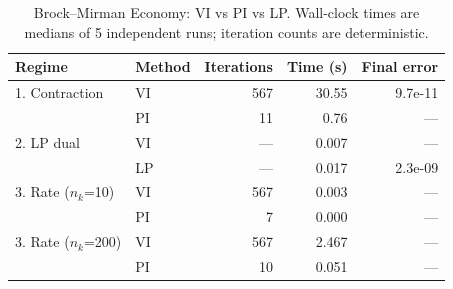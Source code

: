 \begin{table}[t]
\centering
\caption{Brock--Mirman Economy: VI vs PI vs LP. Wall-clock times are medians of 5 independent runs; iteration counts are deterministic.}
\label{tab:brock_mirman}
\begin{tabular}{llrrr}
\hline
Regime & Method & Iterations & Time (s) & Final error \\
\hline
1. Contraction & VI & 567 & 30.55 & 9.7e-11 \\
 & PI & 11 & 0.76 & --- \\
2. LP dual & VI & --- & 0.007 & --- \\
 & LP & --- & 0.017 & 2.3e-09 \\
3. Rate ($n_k$=10) & VI & 567 & 0.003 & --- \\
 & PI & 7 & 0.000 & --- \\
3. Rate ($n_k$=200) & VI & 567 & 2.467 & --- \\
 & PI & 10 & 0.051 & --- \\
\hline
\end{tabular}
\end{table}